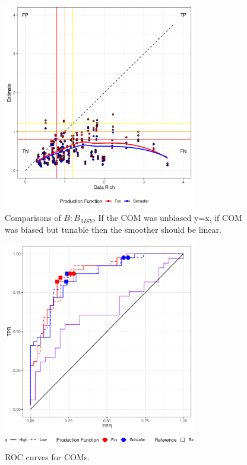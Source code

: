 \begin{figure}[ht!]
\centering
\includegraphics[width=0.75\textwidth]{figs/cf-jabba-1.png}
\caption{Comparisons of $B:B_{MSY}$, If the COM was unbiased y=x, if COM was biased but tunable then the smoother should be linear.}
\label{fig:cf-com}
\end{figure}

\begin{figure}[ht!]
\centering
\includegraphics[width=0.75\textwidth]{figs/roc-jabba-1.png}
\caption{ROC curves for COMs.}
\label{fig:roc-com}
\end{figure}

